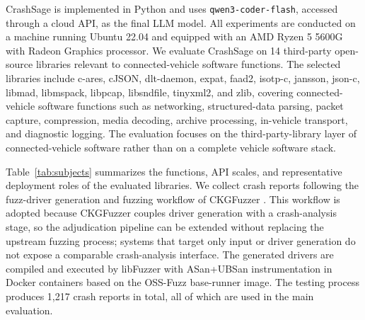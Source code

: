 \documentclass[pdflatex,sn-basic]{sn-jnl}%
\theoremstyle{thmstyleone}%
\theoremstyle{thmstyletwo}%
\theoremstyle{thmstylethree}%
\begin{document}
CrashSage is implemented in Python and uses {\color{blue}\texttt{qwen3-coder-flash}}, accessed through a cloud API, as the final LLM model. All experiments are conducted on a machine running Ubuntu 22.04 and equipped with an AMD Ryzen 5 5600G with Radeon Graphics processor. We evaluate CrashSage on {\color{blue}14} third-party open-source libraries relevant to connected-vehicle software functions. The selected libraries include c-ares, cJSON, {\color{blue}dlt-daemon}, expat, faad2, {\color{blue}isotp-c}, jansson, json-c, libmad, libmspack, libpcap, libsndfile, tinyxml2, and zlib, covering connected-vehicle software functions such as networking, structured-data parsing, packet capture, compression, media decoding, archive processing, {\color{blue}in-vehicle transport, and diagnostic logging}. The evaluation focuses on the third-party-library layer of connected-vehicle software rather than on a complete vehicle software stack.

Table~\ref{tab:subjects} summarizes the functions, API scales, and representative deployment roles of the evaluated libraries. We collect crash reports following the fuzz-driver generation and fuzzing workflow of CKGFuzzer \citep{ref12}. {\color{blue}This workflow is adopted because CKGFuzzer couples driver generation with a crash-analysis stage, so the adjudication pipeline can be extended without replacing the upstream fuzzing process; systems that target only input or driver generation do not expose a comparable crash-analysis interface.} The generated drivers are compiled and executed by libFuzzer with ASan+UBSan instrumentation in Docker containers based on the OSS-Fuzz base-runner image. The testing process produces {\color{blue}1,217} crash reports in total, {\color{blue}all of which are used} in the main evaluation.


\FloatBarrier
\end{document}
